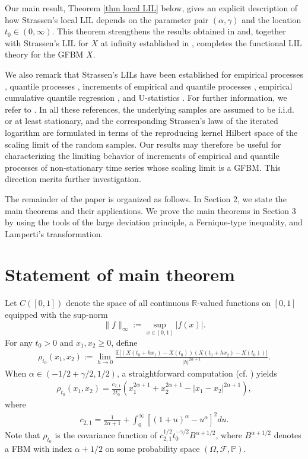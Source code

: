 \documentclass[11pt, reqno]{amsart}
\numberwithin{equation}{section}
\newcommand{\1}{{\bf 1}}
\newcommand{\2}{{\bf 2}}
\begin{document}
Our main result,  Theorem \ref{thm local LIL} below,  gives an explicit description of how  Strassen's local LIL depends on the parameter pair $(\alpha, \gamma)$ and the location 
$t_0\in (0, \infty)$. This theorem strengthens the results obtained in \cite{WX2021a} and, together with Strassen's LIL for $X$ at infinity established in \cite{IPT2021}, completes the functional LIL theory for the GFBM $X$.

We also remark that Strassen's LILs have   been established for
empirical processes   \cite{AT89, F71, James75, Wellner},  
quantile processes \cite{D92},    increments of empirical and 
quantile processes   \cite{DM92}, empirical cumulative 
quantile regression \cite{RZ96},   {and} U-statistics  \cite{AG95}.  {For further 
information, we refer to \cite{LS2001}.}  In all these references, the underlying samples are assumed to be i.i.d. or 
at least stationary, and the corresponding Strassen's laws of 
the iterated logarithm are formulated in terms of the 
reproducing kernel Hilbert space of the scaling limit of the
random samples. Our results may therefore be useful for characterizing the limiting behavior of increments of empirical and quantile processes of non‑stationary time series whose scaling limit is a GFBM. This direction merits further investigation.

The remainder of the paper is organized as follows. In Section 2, we state the main theorems and their applications. We prove the main theorems in Section 3 by using the tools of the large deviation principle, a Fernique-type inequality, and   Lamperti's transformation.

\section{Statement of main theorem}
      
  Let $C([0,1])$  denote the space of  all continuous $\mathbb R$-valued functions on $[0,1]$ equipped with the
     sup-norm $$\|f\|_{\infty}:=\sup_{x\in[0,1]}|f(x)|.$$
             For any $t_0>0$ and $x_1, x_2\ge0$,  define
\begin{align}\label{eq rho}
\rho_{t_0}(x_1, x_2):=\lim_{h\rightarrow 0}\frac{\mathbb E\big[\left(X(t_0+hx_1)-X(t_0)\right)
\left(X(t_0+hx_2)-X(t_0)\right)\big]}{|h|^{ {2\alpha+1}}}.
\end{align}
When $\alpha\in (-1/2+\gamma/2, 1/2)$, a straightforward computation (cf.  \cite[(3.33)]{WX2021a}) yields
   \begin{align}\label{eq limit rho}
   \rho_{t_0}(x_1, x_2)=\frac{c_{2,1}}{2t_0^{\gamma}}\left(x_1^{2\alpha+1} +x_2^{2\alpha+1}-|x_1-x_2|^{2\alpha+1} \right),
   \end{align}
   where  
   \begin{align}\label{eq c21} 
  {  c_{2,1}=\frac{1}{2\alpha+1}+\int_0^{\infty}\left[(1+u)^{\alpha}-u^{\alpha}\right]^2du. }
   \end{align}
    Note that $\rho_{t_0}$ is the covariance function of $c_{2,1}^{1/2} t_{0}^{-\gamma/2} B^{\alpha+1/2}$, where
   $B^{\alpha+1/2}$ denotes  a FBM with index $\alpha+1/2$ on some probability space $(\Omega, \mathcal F, \mathbb P)$.
\end{document}
